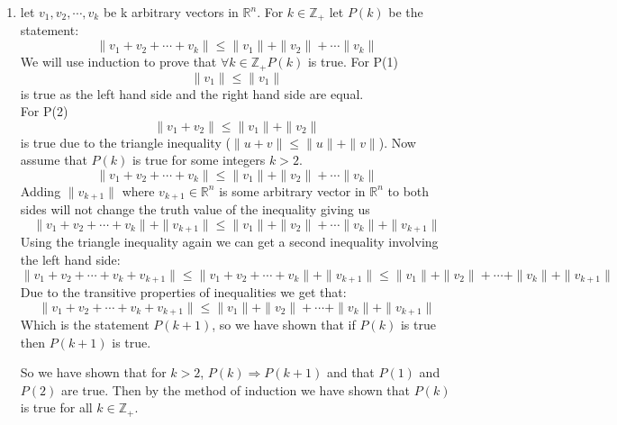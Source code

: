 \documentclass[11pt,a4paper]{article}
\newcommand{\Z}{\mathbb{Z}}
\newcommand{\R}{\mathbb{R}}
\begin{document}
\begin{enumerate}[label=\alph*.]
            Therefore $ y = 0 $.
        \item let $v_1, v_2, \cdots , v_k$ be k arbitrary vectors in $\R^n$. For $k \in \Z_{+}$ let $P(k)$  be the statement:
            \[
                \| v_1 + v_2 + \cdots + v_k \| \leq \| v_1 \| + \| v_2 \| + \cdots \| v_k \|
            \]
        We will use induction to prove that $\forall k \in \Z_+ P(k)$ is true.
        For P(1) \[
            \| v_1 \| \leq \| v_1 \| 
        \] 
        is true as the left hand side and the right hand side are equal. \\
        For P(2) \[
            \| v_1 + v_2 \| \leq \| v_1 \| + \| v_2 \|      
        \] is true due to the triangle inequality ($ \| u + v \| \leq \| u \| + \| v \| $).
        Now assume that $P(k)$ is true for some integers $k > 2$.
        \[
            \| v_1 + v_2 + \cdots + v_k \| \leq \| v_1 \| + \| v_2 \| + \cdots \| v_k \|
        \]
        Adding $\| v_{k+1} \|$ where $v_{k+1} \in \R^n$ is some arbitrary vector in $\R^n$ to both sides will not change the truth value of the inequality giving us
        \[
            \| v_1 + v_2 + \cdots + v_k \| + \| v_{k+1} \|  \leq \| v_1 \| + \| v_2 \| + \cdots \| v_k \| + \| v_{k+1} \| 
        \]
        Using the triangle inequality again we can get a second inequality involving the left hand side:
        \[
            \| v_1 + v_2 + \cdots + v_k + v_{k+1}\|\leq \| v_1 + v_2 + \cdots + v_k \| + \| v_{k+1} \|  \leq \| v_1 \| + \| v_2 \| + \cdots + \| v_k \| + \| v_{k+1} \| 
        \]
        Due to the transitive properties of inequalities we get that:
        \[
            \| v_1 + v_2 + \cdots + v_k + v_{k+1}\| \leq \| v_1 \| + \| v_2 \| + \cdots + \| v_k \| + \| v_{k+1} \| 
        \]
        Which is the statement $P(k+1)$, so we have shown that if $P(k)$ is true then $P(k+1)$ is true.

        So we have shown that for $k > 2$, $P(k) \Rightarrow P(k+1)$ and that $P(1)$ and $P(2)$ are true. Then by the method of induction we have shown that $P(k)$ is true for all $k \in \Z_+$.
       

\end{enumerate}
\end{document}
